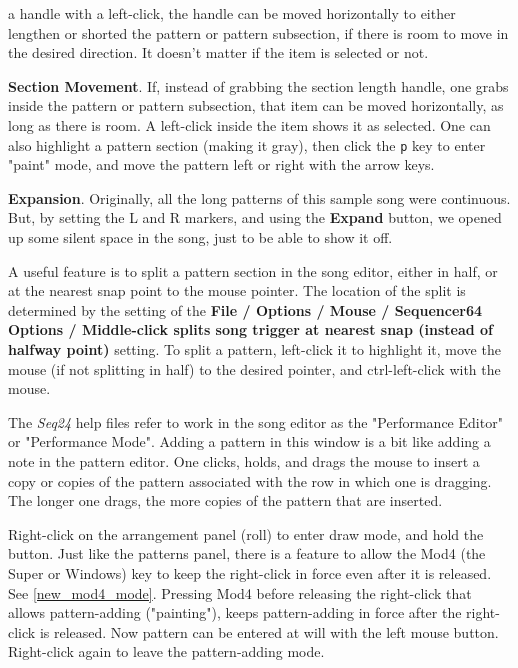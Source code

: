 \begin{enumber}
         a handle with a left-click, the handle can be moved horizontally
         to either lengthen or shorted the pattern or pattern subsection, if
         there is room to move in the desired direction.
         It doesn't matter if the item is selected or not.
      \item \textbf{Section Movement}.
         If, instead of grabbing the section length handle, one grabs inside
         the pattern or pattern subsection, that item can be moved
         horizontally, as long as there is room.  A left-click
         inside the item shows it as selected.
         One can also highlight a pattern section (making it gray),
         then click the \texttt{p} key to enter "paint" mode, and move the
         pattern left or right with the arrow keys.
      \item \textbf{Expansion}.
         Originally, all the long patterns of this sample song were continuous.
         But, by setting the L and R markers, and using the \textbf{Expand}
         button, we opened up some silent space in the song, just to be able
         to show it off.
   \end{enumber}

   A useful feature is to split a pattern section in the
   song editor, either in half, or at the nearest snap point to the mouse
   pointer.
   The location of the split is determined by the
   setting of the \textbf{File / Options / Mouse / Sequencer64 Options /
   Middle-click splits song trigger at nearest snap (instead of halfway point)}
   setting.  To split a pattern, left-click it to highlight it, move
   the mouse (if not splitting in half) to the desired pointer, and
   ctrl-left-click with the mouse.

   The \textsl{Seq24} help files refer to work in the song editor as the
   "Performance Editor" or "Performance Mode".  Adding a pattern in this
   window is a bit like adding a note in the pattern editor.
   One clicks, holds, and drags the mouse to insert a copy or copies of the
   pattern associated with the row in which one is dragging.
   The longer one drags, the more copies of the pattern that are inserted.

	Right-click on the arrangement panel (roll) to enter
   draw mode, and hold the button.
   Just like the patterns panel, there is a feature to allow the Mod4 (the
   Super or Windows) key to keep the right-click in force even after it is
   released.  See \ref{new_mod4_mode}.  Pressing Mod4 before
   releasing the right-click that allows pattern-adding ("painting"), keeps
   pattern-adding in force after the right-click is released.  Now pattern
   can be entered at will with the left mouse button.  Right-click again to
   leave the pattern-adding mode.

